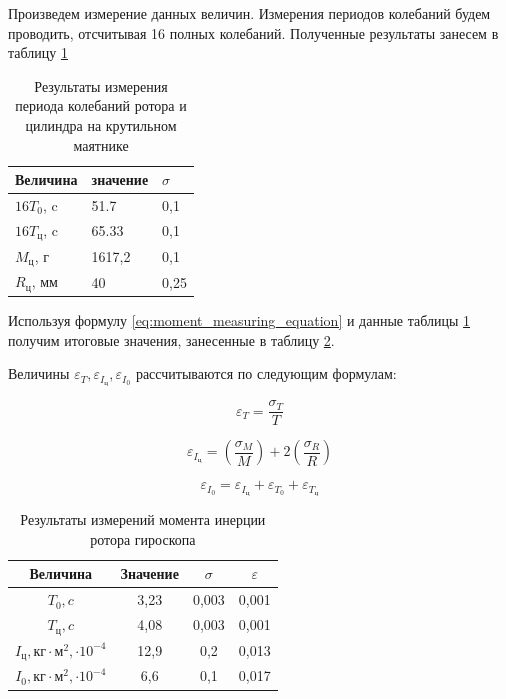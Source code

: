 \documentclass[a4paper, 12pt]{article}
\begin{document}
Произведем измерение данных величин.
Измерения периодов колебаний будем проводить, отсчитывая 16 полных колебаний. Полученные результаты занесем в таблицу \ref{tabl:results_of_measuring}

\begin{table}[h!]
	\centering
		\begin{tabular}{|l|l|l|}
			\hline
			Величина 			 & значение & $\sigma$    \\ \hline
			$16T_{0}$, c  		 & 51.7     & 0,1         \\ \hline
            $16T_{\text{ц}}$, c  & 65.33    & 0,1         \\ \hline
			$M_{\text{ц}}$, г    & 1617,2   & 0,1         \\ \hline
			$R_{\text{ц}}$, мм   & 40       & 0,25        \\ \hline
		\end{tabular}
		\caption{Результаты измерения периода колебаний ротора и цилиндра на крутильном маятнике}
		\label{tabl:results_of_measuring}
\end{table}

Используя формулу \ref{eq:moment_measuring_equation} и данные таблицы \ref{tabl:results_of_measuring} получим итоговые значения, занесенные в таблицу \ref{tabl:results_of_measuring_moment}.

Величины $\varepsilon_{T}, \varepsilon_{I_{\text{ц}}}, \varepsilon_{I_{0}}$ рассчитываются по следующим формулам:

\begin{equation}
	\varepsilon_{T} = \frac{\sigma_{T}}{T}
\end{equation}	

\begin{equation}
	\varepsilon_{I_{\text{ц}}} = \left(\frac{\sigma_{M}}{M}\right) + 2\left(\frac{\sigma_{R}}{R}\right)
\end{equation}	

\begin{equation}
	\varepsilon_{I_{0}} = \varepsilon_{I_{\text{ц}}} + \varepsilon_{T_{0}} + \varepsilon_{T_{\text{ц}}}
\end{equation}

\begin{table}[h!]
	\centering
	\begin{tabular}{|c|c|c|c|}
		\hline
		Величина           & Значение       & $\sigma$      & $\varepsilon$     \\ \hline
		$T_{0}, c$         & 3,23           & 0,003         & 0,001             \\ \hline
		$T_{\text{ц}}, c$  & 4,08           & 0,003         & 0,001             \\ \hline
		$I_{\text{ц}}, \text{кг}\cdot \text{м}^{2}, \cdot 10^{-4}$  & 12,9  & 0,2 & 0,013 \\ \hline
		$I_{\text{0}}, \text{кг}\cdot \text{м}^{2}, \cdot 10^{-4}$  & 6,6   & 0,1 & 0,017 \\ \hline
	\end{tabular}
	\caption{Результаты измерений момента инерции ротора гироскопа}
	\label{tabl:results_of_measuring_moment}
\end{table}
\end{document}
